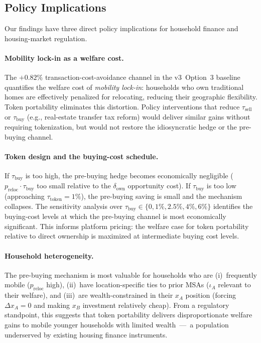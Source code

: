 \subsection{Policy Implications}
\label{sec:discussion:policy}

Our findings have three direct policy implications for household finance
and housing-market regulation.

\paragraph{Mobility lock-in as a welfare cost.}
The $+0.82\%$ transaction-cost-avoidance channel in the v3~Option~3 baseline
quantifies the welfare cost of \emph{mobility lock-in}: households who own
traditional homes are effectively penalized for relocating, reducing their
geographic flexibility.
Token portability eliminates this distortion.
Policy interventions that reduce $\tau_{\text{sell}}$ or $\tau_{\text{buy}}$
(e.g., real-estate transfer tax reform) would deliver similar gains without
requiring tokenization, but would not restore the idiosyncratic hedge or the
pre-buying channel.

\paragraph{Token design and the buying-cost schedule.}
If $\tau_{\text{buy}}$ is too high, the pre-buying hedge becomes economically
negligible ($p_{\text{reloc}} \cdot \tau_{\text{buy}}$ too small relative to
the $\delta_{\text{own}}$ opportunity cost).
If $\tau_{\text{buy}}$ is too low (approaching $\tau_{\text{token}} = 1\%$),
the pre-buying saving is small and the mechanism collapses.
The sensitivity analysis over $\tau_{\text{buy}} \in \{0, 1\%, 2.5\%, 4\%, 6\%\}$
identifies the buying-cost levels at which the pre-buying channel is most
economically significant.
This informs platform pricing: the welfare case for token portability relative
to direct ownership is maximized at intermediate buying cost levels.

\paragraph{Household heterogeneity.}
The pre-buying mechanism is most valuable for households who are
(i)~frequently mobile ($p_{\text{reloc}}$ high),
(ii)~have location-specific ties to prior MSAs ($\iota_A$ relevant to their
     welfare), and
(iii)~are wealth-constrained in their $x_A$ position (forcing $\Delta x_A = 0$
      and making $x_B$ investment relatively cheap).
From a regulatory standpoint, this suggests that token portability delivers
disproportionate welfare gains to mobile younger households with limited
wealth~---~a population underserved by existing housing finance instruments.

